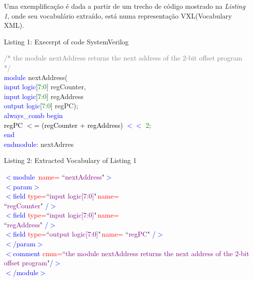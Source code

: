 \documentclass[12pt, twocolumn, a4paper]{article}
\begin{document}
Uma exemplificação é dada a partir de um trecho de código mostrado na \textit{Listing 1}, onde seu vocabulário extraído, está numa representação VXL(Vocabulary XML).
\begin{center}
{\footnotesize Listing 1: Execerpt of code SystemVerilog}
\end{center}
{\footnotesize
\textcolor{gray}{/* the module nextAddress returns the}
\textcolor{gray}{next address of the 2-bit offset program}
\textcolor{gray}{*/}\\
\textcolor{blue}{module} nextAddress(\\\textcolor{blue}{\qquad input logic}[\textcolor{green}{7}:\textcolor{green}{0}] regCounter,\\ \textcolor{blue}{\qquad input logic}[\textcolor{green}{7}:\textcolor{green}{0}] regAddress\\
\textcolor{blue}{\qquad output logic}[\textcolor{green}{7}:\textcolor{green}{0}] regPC);\\
\textcolor{blue}{\quad always\_comb begin}\\
\textcolor{black}{\qquad regPC $<$= (regCounter + regAddress)} \textcolor{blue}{$<<$} \textcolor{green}{2};\\
\textcolor{blue}{\quad end}\\
\textcolor{blue}{endmodule}: nextAdrres\\
\begin{center}
{\footnotesize Listing 2: Extracted Vocabulary of Listing 1}
\end{center}}
{\footnotesize
\textcolor{blue}{$<$module} \textcolor{red}{\,name=} ``\textcolor{purple}{nextAddress}"\textcolor{blue}{$>$}\\
\textcolor{blue}{\quad$<$param$>$}\\
\textcolor{blue}{\qquad$<$field} \textcolor{red}{type=}``\textcolor{purple}{input logic[7:0]}"\textcolor{red}{\,name=}\\\textcolor{black}{\qquad ``}\textcolor{purple}{regCounter}" \textcolor{blue}{/$>$}\\
\textcolor{blue}{\qquad$<$field} \textcolor{red}{type=}``\textcolor{purple}{input logic[7:0]}"\textcolor{red}{\,name=}\\\textcolor{black}{\qquad ``}\textcolor{purple}{regAddress}" \textcolor{blue}{/$>$}\\
\textcolor{blue}{\qquad$<$field} \textcolor{red}{type=}``\textcolor{purple}{output logic[7:0]}"\textcolor{red}{\,name=} ``\textcolor{purple}{regPC}" \textcolor{blue}{/$>$}\\
\textcolor{blue}{\quad$<$/param$>$}\\
\textcolor{blue}{\quad$<$comment} \textcolor{red}{cmm=}``\textcolor{purple}{the module nextAddress returns the next address of the 2-bit offset program}"\textcolor{blue}{/$>$}\\
\textcolor{blue}{$<$/module$>$}}\\
\end{document}
